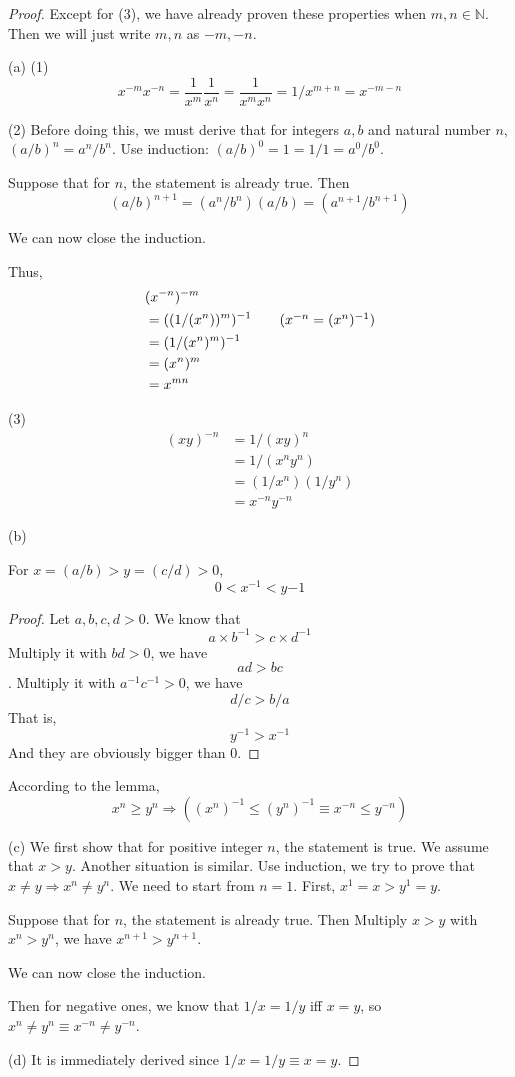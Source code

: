 \begin{proof}
Except for (3),
we have already proven these properties when $m,n \in \mathbb{N}$. Then we will just write $m,n$ as $-m,-n$.

(a)
(1)
\[
x^{-m}x^{-n} = \frac{1}{x^m}\frac{1}{x^n} = \frac{1}{x^mx^n}=1/x^{m+n} = x^{-m-n}
\]

(2)
Before doing this, we must derive that for integers $a,b$ and natural number $n$, $(a/b)^n = a^n/b^n$. Use 
induction: $(a/b)^0 = 1 = 1/1 = a^0/b^0$.

Suppose that for $n$, the statement is already true. Then 
\[
(a/b)^{n+1} = (a^n/b^n)(a/b) = (a^{n+1}/b^{n+1})
\]

We can now close the induction.

Thus, 
\begin{align*}
&(x^{-n})^{-m} \\
&= ((1/(x^n))^m)^{-1} \tag{$x^{-n} = (x^n)^{-1}$} \\
&= (1/(x^n)^m)^{-1} \\
&= (x^n)^m \\
&= x^{mn}
\end{align*}

(3)
\begin{align*}
(xy)^{-n} 
&= 1/(xy)^n \\
&= 1/(x^ny^n) \\
&= (1/x^n) (1/y^n) \\
&= x^{-n}y^{-n}
\end{align*}

(b)
\begin{lem}
For $x = (a/b) >  y = (c/d) > 0$,
\[
0 < x^{-1} < y{-1}
\]
\end{lem}
\begin{proof}
Let $a,b,c,d>0$. We know that
\[
a \times b^{-1} > c \times d^{-1}
\]
Multiply it with $bd>0$, we have
\[
ad>bc
\].
Multiply it with $a^{-1}c^{-1} >0$, we have
\[
d/c>b/a
\]
That is,
\[
y^{-1} > x^{-1}
\]
And they are obviously bigger than $0$.
\end{proof}

According to the lemma,
\[
x^{n} \geq y^{n} \Longrightarrow ((x^{n})^{-1} \leq (y^{n})^{-1} \equiv x^{-n} \leq y^{-n})
\]

(c)
We first show that for positive integer $n$, the statement is true. We assume that $x>y$. Another situation is 
similar.
Use induction, we try to prove that $x\neq y \Longrightarrow x^n \neq y^n$. We need to start from $n=1$. First, 
$x^1=x > y^1=y$. 

Suppose that for $n$, the statement is already true. Then
Multiply $x>y$ with $x^n > y^n$, 
we have $x^{n+1} > y^{n+1}$.

We can now close the induction.

Then for negative ones, we know that $1/x = 1/y$ iff $x=y$, so $x^n \neq y^n \equiv x^{-n} \neq y^{-n}$.

(d)
It is immediately derived since $1/x = 1/y \equiv x=y$.
\end{proof}

